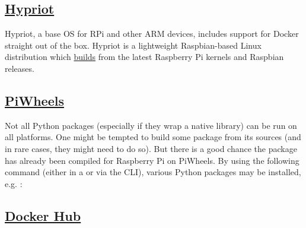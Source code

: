 \subsection{\href{https://blog.hypriot.com/}{Hypriot}}\label{subsec:hypriot}

Hypriot, a base OS for RPi and other ARM devices, includes support for Docker straight out of the box. Hypriot is a lightweight Raspbian-based Linux distribution which \href{https://github.com/hypriot/image-builder-rpi}{builds} from the latest Raspberry Pi kernels and Raspbian releases.

\subsection{\href{https://www.piwheels.org/}{PiWheels}}

Not all Python packages (especially if they wrap a native library) can be run on all platforms. One might be tempted to build some package from its sources (and in rare cases, they might need to do so). But there is a good chance the package has already been compiled for Raspberry Pi on PiWheels. By using the following command (either in a  or via the CLI), various Python packages may be installed, e.g. :
%

\subsection{\href{https://hub.docker.com/}{Docker Hub}}\label{subsec:docker_hub}

